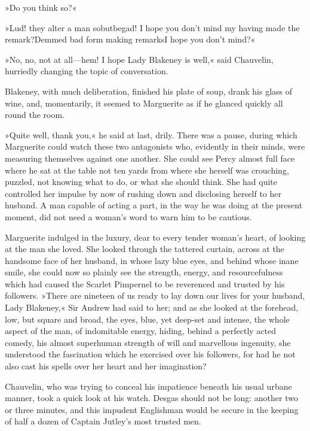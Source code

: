 »Do you think so?«

»Lud! they alter a man so\textellipsis \allowbreak  but\textellipsis \allowbreak  begad! I hope you don't mind my having made the remark?\textellipsis \allowbreak  Demmed bad form making remarks\textellipsis \allowbreak  I hope you don't mind?«

»No, no, not at all—hem! I hope Lady Blakeney is well,« said Chauvelin, hurriedly changing the topic of conversation.

Blakeney, with much deliberation, finished his plate of soup, drank his glass of wine, and, momentarily, it seemed to Marguerite as if he glanced quickly all round the room.

»Quite well, thank you,« he said at last, drily. There was a pause, during which Marguerite could watch these two antagonists who, evidently in their minds, were measuring themselves against one another. She could see Percy almost full face where he sat at the table not ten yards from where she herself was crouching, puzzled, not knowing what to do, or what she should think. She had quite controlled her impulse by now of rushing down and disclosing herself to her husband. A man capable of acting a part, in the way he was doing at the present moment, did not need a woman's word to warn him to be cautious.

Marguerite indulged in the luxury, dear to every tender woman's heart, of looking at the man she loved. She looked through the tattered curtain, across at the handsome face of her husband, in whose lazy blue eyes, and behind whose inane smile, she could now so plainly see the strength, energy, and resourcefulness which had caused the Scarlet Pimpernel to be reverenced and trusted by his followers. »There are nineteen of us ready to lay down our lives for your husband, Lady Blakeney,« Sir Andrew had said to her; and as she looked at the forehead, low, but square and broad, the eyes, blue, yet deep-set and intense, the whole aspect of the man, of indomitable energy, hiding, behind a perfectly acted comedy, his almost superhuman strength of will and marvellous ingenuity, she understood the fascination which he exercised over his followers, for had he not also cast his spells over her heart and her imagination?

Chauvelin, who was trying to conceal his impatience beneath his usual urbane manner, took a quick look at his watch. Desgas should not be long: another two or three minutes, and this impudent Englishman would be secure in the keeping of half a dozen of Captain Jutley's most trusted men.

